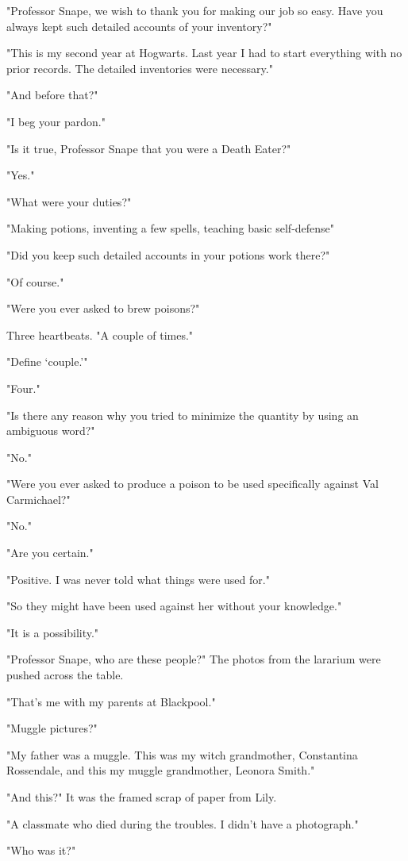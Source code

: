 "Professor Snape, we wish to thank you for making our job so easy. Have you always kept such detailed accounts of your inventory?"

"This is my second year at Hogwarts. Last year I had to start everything with no prior records. The detailed inventories were necessary."

"And before that?"

"I beg your pardon."

"Is it true, Professor Snape that you were a Death Eater?"

"Yes."

"What were your duties?"

"Making potions, inventing a few spells, teaching basic self-defense{\el}"

"Did you keep such detailed accounts in your potions work there?"

"Of course."

"Were you ever asked to brew poisons?"

Three heartbeats. "A couple of times."

"Define `couple.'"

"Four."

"Is there any reason why you tried to minimize the quantity by using an ambiguous word?"

"No."

"Were you ever asked to produce a poison to be used specifically against Val Carmichael?"

"No."

"Are you certain."

"Positive. I was never told what things were used for."

"So they might have been used against her without your knowledge."

"It is a possibility."

"Professor Snape, who are these people?" The photos from the lararium were pushed across the table.

"That's me with my parents at Blackpool."

"Muggle pictures?"

"My father was a muggle. This was my witch grandmother, Constantina Rossendale, and this my muggle grandmother, Leonora Smith."

"And this?" It was the framed scrap of paper from Lily.

"A classmate who died during the troubles. I didn't have a photograph."

"Who was it?"

